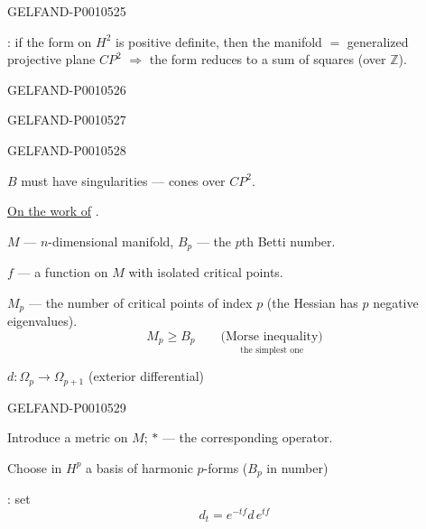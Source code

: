 \begin{GelfandAdjacentEvidence}{GELFAND-P001052}{5}


: if the form on $H^2$ is positive definite, then the manifold $=$
generalized projective plane $CP^2$
$\Rightarrow$ the form reduces to a sum of squares (over $\mathbb Z$).
\end{GelfandAdjacentEvidence}
\begin{GelfandAdjacentEvidence}{GELFAND-P001052}{6}

\end{GelfandAdjacentEvidence}
\begin{GelfandAdjacentEvidence}{GELFAND-P001052}{7}

\end{GelfandAdjacentEvidence}
\begin{GelfandAdjacentEvidence}{GELFAND-P001052}{8}


$B$ must have singularities — cones over $CP^2$.

\underline{On the work of} .

$M$ — $n$-dimensional manifold, $B_p$ — the \(p\)th Betti number.

$f$ — a function on $M$ with isolated critical points.

$M_p$ — the number of critical points of index $p$ (the Hessian has $p$ negative eigenvalues).
\[
M_p\geqslant B_p
\qquad\underset{\text{the simplest one}}{\text{(Morse inequality)}}
\]

$d:\Omega_p\longrightarrow\Omega_{p+1}$ (exterior differential)
\end{GelfandAdjacentEvidence}
\begin{GelfandAdjacentEvidence}{GELFAND-P001052}{9}


Introduce a metric on $M$; $*$ — the corresponding operator.

Choose in $H^p$ a basis of harmonic $p$-forms ($B_p$ in number)

: set
\[
d_t=e^{-tf}d\,e^{tf}
\]
\end{GelfandAdjacentEvidence}

